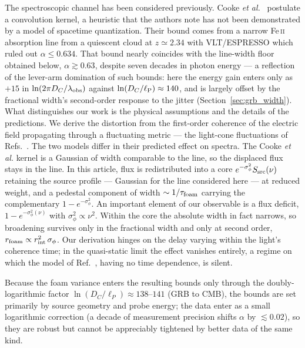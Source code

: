 \documentclass[aps,prd,onecolumn,amsmath,amssymb]{revtex4-2}
\begin{document}
The spectroscopic channel has been considered previously.
Cooke \textit{et al.}~\cite{Cooke2020} postulate a convolution kernel,
a heuristic that the authors note has not been demonstrated by a model of
spacetime quantization.
Their bound comes from a narrow
Fe\,\textsc{ii} absorption line from a quiescent cloud at $z\simeq2.34$
with VLT/ESPRESSO which ruled out $\alpha\leq0.634$.
That bound nearly coincides with the line-width floor obtained below,
$\alpha\gtrsim0.63$, despite seven decades in photon energy --- a reflection
of the lever-arm domination of such bounds: here the energy gain enters only
as $+15$ in $\ln(2\pi D_C/\lambda_{\rm obs})$ against
$\ln(D_C/\ell_{\rm P})\approx140$, and is largely offset by the fractional
width's second-order response to the jitter
(Section~\ref{sec:grb_width}).
What distinguishes our work is the physical assumptions and the details of the predictions.
We derive the distortion from the
first-order coherence of the electric field propagating through a fluctuating metric
--- the light-cone fluctuations of
Refs.~\cite{Ford1995,FordSvaiter1996}.
The two models differ in their predicted effect on spectra.
The Cooke \textit{et al.} kernel is a Gaussian of width comparable to the
line, so the displaced flux stays in the line.  In this article, flux is
redistributed into a core $e^{-\sigma_\phi^2}S_{\rm src}(\nu)$ retaining the
source profile --- Gaussian for the line considered here --- at reduced
weight, and a pedestal component of width $\sim1/\tau_{\rm foam}$ carrying
the complementary $1-e^{-\sigma_\phi^2}$.  An important element of our
observable is a flux deficit, $1-e^{-\sigma_\phi^2(\nu)}$ with
$\sigma_\phi^2\propto\nu^2$.  Within the core the absolute width in fact
narrows, so broadening survives only in the fractional width and only at
second order, $r_{\rm foam}\propto r_{\rm int}^2\,\sigma_\phi$.
Our derivation hinges on the delay varying within the light's coherence
time; in the quasi-static limit the effect vanishes entirely, a regime on
which the model of Ref.~\cite{Cooke2020}, having no time dependence, is
silent.

Because the foam variance enters the resulting bounds only through the
doubly-logarithmic factor $\ln(D_C/\ell_P)\approx138$--$141$ (GRB to CMB),
the bounds are set primarily by source geometry and probe energy; the data enter as a small
logarithmic correction (a decade of measurement precision shifts $\alpha$
by $\lesssim0.02$), so they are robust but cannot be appreciably tightened
by better data of the same kind.
\end{document}
